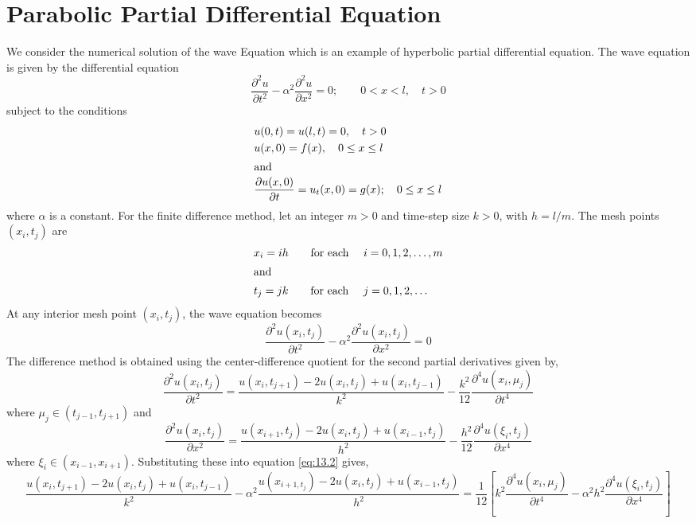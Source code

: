 \documentclass[../main-sheet.tex]{subfiles}
\begin{document}
\chapter{Parabolic Partial Differential Equation}
We consider the numerical solution of the wave Equation which is an example of hyperbolic partial differential equation. The wave equation is given by the differential equation
\begin{equation}
    \frac{\partial^2 u}{\partial t^2}-\alpha^2\frac{\partial^2 u}{\partial x^2}=0;\qquad 0<x<l,\quad t>0\label{eq:13.1}
\end{equation}
subject to the conditions
\begin{align*}
    &u(0,t)=u(l,t)=0,\quad t>0\\
    &u(x,0)=f(x),\quad 0\leq x\leq l\\
    \intertext{and}
    &\frac{\partial u(x,0)}{\partial t}=u_t(x,0)=g(x);\quad 0\leq x\leq l
\end{align*}
where \(\alpha\) is a constant. For the finite difference method, let an integer \(m>0\) and time-step size \(k>0\), with \(h=l/m\). The mesh points \((x_i,t_j)\) are 
\begin{align*}
    &x_i=ih\qquad \text{for each }\quad i=0,1,2,\dots,m\\
    \intertext{and}
    &t_j=jk\qquad \text{for each }\quad j=0,1,2,\dots
\end{align*}
At any interior mesh point \((x_i,t_j)\), the wave equation becomes
\begin{equation}
    \frac{\partial^2 u(x_i,t_j)}{\partial t^2}-\alpha^2\frac{\partial^2 u(x_i,t_j)}{\partial x^2}=0\label{eq:13.2}
\end{equation}
The difference method is obtained using the center-difference quotient for the second partial derivatives given by,
\[
    \frac{\partial^2 u(x_i,t_j)}{\partial t^2}=\frac{u(x_i,t_{j+1})-2u(x_i,t_j)+u(x_i,t_{j-1})}{k^2}-\frac{k^2}{12}\frac{\partial^4 u(x_i,\mu_j)}{\partial t^4}
    \]
    where \(\mu_j\in (t_{j-1},t_{j+1})\) and
    \[
        \frac{\partial^2 u(x_i,t_j)}{\partial x^2}=\frac{u(x_{i+1},t_{j})-2u(x_i,t_j)+u(x_{i-1},t_{j})}{h^2}-\frac{h^2}{12}\frac{\partial^4 u(\xi_i,t_j)}{\partial x^4}\]
        where \(\xi_i\in (x_{i-1},x_{i+1})\). Substituting these into equation \eqref{eq:13.2} gives,
    \[\frac{u(x_i,t_{j+1})-2u(x_i,t_j)+u(x_i,t_{j-1})}{k^2}-\alpha^2\frac{u(x_{i+1,t_j})-2u(x_i,t_j)+u(x_{i-1},t_j)}{h^2}
    =\frac{1}{12}\left[ k^2\frac{\partial^4 u(x_i,\mu_j)}{\partial t^4}-\alpha^2h^2\frac{\partial^4 u(\xi_i,t_j)}{\partial x^4} \right]\]
\end{document}

